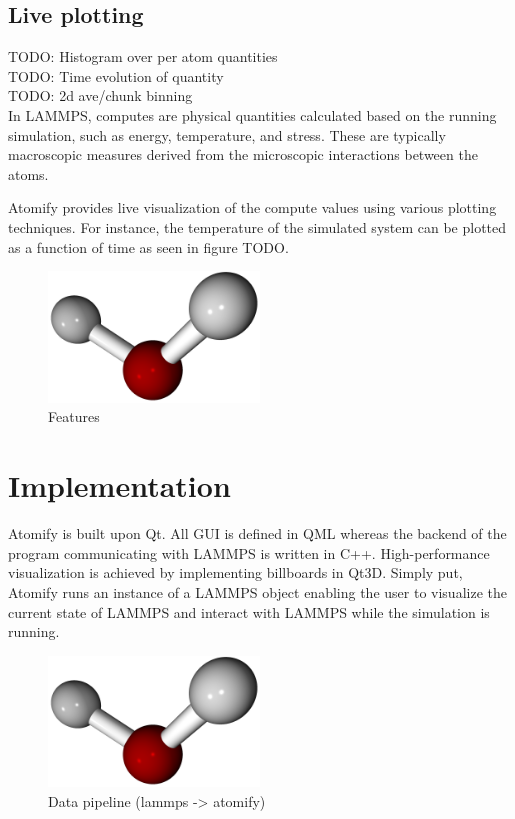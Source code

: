 \documentclass[aps,pre,twocolumn,letterpaper,floatfix]{revtex4-1}
\begin{document}
\subsection{Live plotting}
TODO: Histogram over per atom quantities \\
TODO: Time evolution of quantity \\
TODO: 2d ave/chunk binning \\

In LAMMPS, computes are physical quantities calculated based on the running
simulation, such as energy, temperature, and stress.
These are typically macroscopic measures derived from the microscopic
interactions between the atoms.

Atomify provides live visualization of the compute values using various plotting
techniques.
For instance, the temperature of the simulated system can be plotted as a
function of time as seen in figure TODO.

\begin{figure}
	\centering
	\includegraphics[width=0.5\textwidth]{final_billboard.png}
	\caption{Features}
	\label{fig:gui}
\end{figure}

\section{Implementation}

Atomify is built upon Qt.
All GUI is defined in QML whereas the backend of the program communicating with
LAMMPS is written in C++.
High-performance visualization is achieved by implementing billboards in Qt3D.
Simply put, Atomify runs an instance of a LAMMPS object enabling the user to
visualize the current state of LAMMPS and interact with LAMMPS while the
simulation is running. 

\begin{figure}
	\centering
	\includegraphics[width=0.5\textwidth]{final_billboard.png}
	\caption{Data pipeline (lammps -> atomify)}
	\label{fig:gui}
\end{figure}
\end{document}
